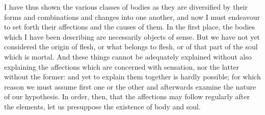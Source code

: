 I have thus shown the various classes of bodies as they are diversified by
their forms and combinations and changes into one another, and now I must
endeavour to set forth their affections and the causes of them. In the
first place, the bodies which I have been describing are necessarily
objects of sense. But we have not yet considered the origin of flesh, or
what belongs to flesh, or of that part of the soul which is mortal. And
these things cannot be adequately explained without also explaining the
affections which are concerned with sensation, nor the latter without the
former: and yet to explain them together is hardly possible; for which
reason we must assume first one or the other and afterwards examine the
nature of our hypothesis. In order, then, that the affections may follow
regularly after the elements, let us presuppose the existence of body and
soul.

